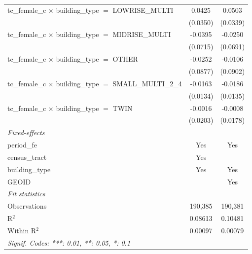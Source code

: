 \begin{tabular}{lcc}
   tc\_female\_c $\times$ building\_type $=$ LOWRISE\_MULTI            & 0.0425          & 0.0503\\   
                                                                       & (0.0350)        & (0.0339)\\   
   tc\_female\_c $\times$ building\_type $=$ MIDRISE\_MULTI            & -0.0395         & -0.0250\\   
                                                                       & (0.0715)        & (0.0691)\\   
   tc\_female\_c $\times$ building\_type $=$ OTHER                     & -0.0252         & -0.0106\\   
                                                                       & (0.0877)        & (0.0902)\\   
   tc\_female\_c $\times$ building\_type $=$ SMALL\_MULTI\_2\_4        & -0.0163         & -0.0186\\   
                                                                       & (0.0134)        & (0.0135)\\   
   tc\_female\_c $\times$ building\_type $=$ TWIN                      & -0.0016         & -0.0008\\   
                                                                       & (0.0203)        & (0.0178)\\   
   \midrule
   \emph{Fixed-effects}\\
   period\_fe                                                          & Yes             & Yes\\  
   census\_tract                                                       & Yes             & \\  
   building\_type                                                      & Yes             & Yes\\  
   GEOID                                                               &                 & Yes\\  
   \midrule
   \emph{Fit statistics}\\
   Observations                                                        & 190,385         & 190,381\\  
   R$^2$                                                               & 0.08613         & 0.10481\\  
   Within R$^2$                                                        & 0.00097         & 0.00079\\  
   \midrule \midrule
   \multicolumn{3}{l}{\emph{Signif. Codes: ***: 0.01, **: 0.05, *: 0.1}}\\
\end{tabular}
